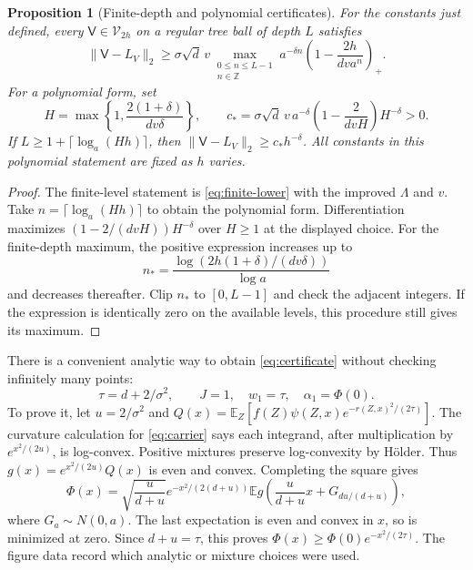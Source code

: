 \documentclass[11pt]{article}
\newtheorem{proposition}[theorem]{Proposition}
\theoremstyle{definition}
\theoremstyle{remark}
\newcommand{\E}{\mathbb E}
\newcommand{\Vcl}{\mathcal V}
\begin{document}
\begin{proposition}[Finite-depth and polynomial certificates]
\label{prop:stronger}
For the constants just defined, every $\mathsf V\in\Vcl_{2h}$ on a regular tree
ball of depth $L$ satisfies
\begin{equation}
 \|\mathsf V-L_V\|_2\ge\sigma\sqrt d\,v
  \max_{\substack{0\le n\le L-1\\n\in\mathbb Z}}
       a^{-\delta n}\left(1-\frac{2h}{dv a^n}\right)_+.
 \label{eq:strong-finite}
\end{equation}
For a polynomial form, set
\[
 H=\max\left\{1,\frac{2(1+\delta)}{dv\delta}\right\},\qquad
 c_* =\sigma\sqrt d\,v\,a^{-\delta}
                \left(1-\frac2{dvH}\right)H^{-\delta}>0.
\]
If $L\ge1+\lceil\log_a(Hh)\rceil$, then
$\|\mathsf V-L_V\|_2\ge c_*h^{-\delta}$.
All constants in this polynomial statement are fixed as $h$ varies.
\end{proposition}
\begin{proof}
The finite-level statement is \eqref{eq:finite-lower} with the improved
$\Lambda$ and $v$. Take $n=\lceil\log_a(Hh)\rceil$ to obtain the polynomial
form. Differentiation maximizes
$(1-2/(dvH))H^{-\delta}$ over $H\ge1$ at the displayed choice.
For the finite-depth maximum, the positive expression increases up to
\[
 n_* =\frac{\log(2h(1+\delta)/(dv\delta))}{\log a}
\]
and decreases thereafter. Clip $n_*$ to $[0,L-1]$ and check the adjacent
integers. If the expression is identically zero on the available levels,
this procedure still gives its maximum.
\end{proof}

There is a convenient analytic way to obtain \eqref{eq:certificate} without
checking infinitely many points:
\begin{equation}
 \tau=d+2/\sigma^2,\qquad J=1,\quad w_1=\tau,\quad\alpha_1=\Phi(0).
 \label{eq:widening}
\end{equation}
To prove it, let $u=2/\sigma^2$ and
$Q(x)=\E_Z[f(Z)\psi(Z,x)e^{-r(Z,x)^2/(2\tau)}]$.
The curvature calculation for \eqref{eq:carrier} says each integrand,
after multiplication by $e^{x^2/(2u)}$, is log-convex. Positive mixtures
preserve log-convexity by H\"older. Thus $g(x)=e^{x^2/(2u)}Q(x)$ is even
and convex. Completing the square gives
\[
 \Phi(x)=\sqrt{\frac{u}{d+u}}e^{-x^2/(2(d+u))}
       \E g\left(\frac{u}{d+u}x+G_{du/(d+u)}\right),
\]
where $G_a\sim N(0,a)$. The last expectation is even and convex in $x$,
so is minimized at zero. Since $d+u=\tau$, this proves
$\Phi(x)\ge\Phi(0)e^{-x^2/(2\tau)}$.
The figure data record which analytic or mixture choices were used.
\end{document}
